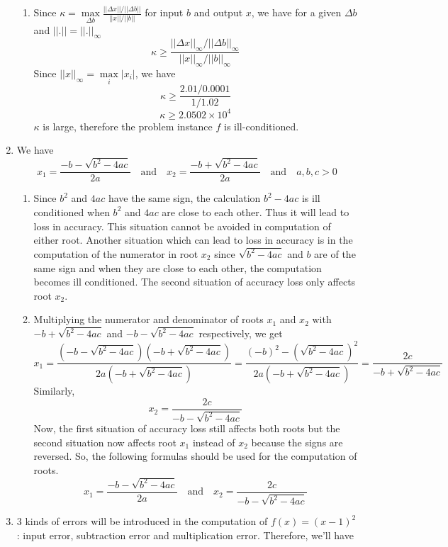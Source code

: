 \documentclass{article}
\begin{document}
\begin{enumerate}
\begin{enumerate}[label=(\alph*)]
        \item Since $\kappa = \max\limits_{\Delta b}\frac{||\Delta x|| / ||\Delta b||}{||x|| / ||b||}$ for input $b$ and output $x$, we have for a given $\Delta b$ and $||.|| = ||.||_\infty$
        $$\kappa \geq \frac{||\Delta x||_\infty / ||\Delta b||_\infty}{||x||_\infty / ||b||_\infty}$$
        Since $||x||_\infty = \max\limits_i|x_i|$, we have
        $$\kappa \geq \frac{2.01 / 0.0001}{1 / 1.02}$$
        $$\kappa \geq 2.0502 \times 10^4$$
        $\kappa$ is large, therefore the problem instance $f$ is ill-conditioned.
    \end{enumerate}
    \clearpage
    \item We have
    $$x_1 = \frac{-b - \sqrt{b^2 - 4ac}}{2a} \quad \textrm{and} \quad x_2 = \frac{-b + \sqrt{b^2 - 4ac}}{2a} \quad \textrm{and} \quad a,b,c > 0$$
    \begin{enumerate}[label=(\alph*)]
        \item Since $b^2$ and $4ac$ have the same sign, the calculation $b^2 - 4ac$ is ill conditioned when $b^2$ and $4ac$ are close to each other. Thus it will lead to loss in accuracy. This situation cannot be avoided in computation of either root. Another situation which can lead to loss in accuracy is in the computation of the numerator in root $x_2$ since $\sqrt{b^2 - 4ac}$ and $b$ are of the same sign and when they are close to each other, the computation becomes ill conditioned. The second situation of accuracy loss only affects root $x_2$.
        \item Multiplying the numerator and denominator of roots $x_1$ and $x_2$ with $-b + \sqrt{b^2 - 4ac}$ and $-b - \sqrt{b^2 - 4ac}$ respectively, we get
        $$x_1 = \frac{(-b - \sqrt{b^2 - 4ac})(-b + \sqrt{b^2 - 4ac})}{2a(-b + \sqrt{b^2 - 4ac})} = \frac{(-b)^2 - (\sqrt{b^2 - 4ac})^2}{2a(-b + \sqrt{b^2 - 4ac})} = \frac{2c}{-b + \sqrt{b^2 - 4ac}}$$
        Similarly,
        $$x_2 = \frac{2c}{-b - \sqrt{b^2 - 4ac}}$$
        Now, the first situation of accuracy loss still affects both roots but the second situation now affects root $x_1$ instead of $x_2$ because the signs are reversed. So, the following formulas should be used for the computation of roots.
        $$x_1 = \frac{-b - \sqrt{b^2 - 4ac}}{2a} \quad \textrm{and} \quad x_2 = \frac{2c}{-b - \sqrt{b^2 - 4ac}}$$
    \end{enumerate}
    \item 3 kinds of errors will be introduced in the computation of $f(x) = (x - 1)^2$: input error, subtraction error and multiplication error. Therefore, we'll have

\end{enumerate}
\end{document}
